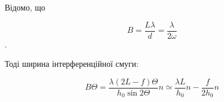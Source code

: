 Відомо, що 

$$ B = \frac{L \lambda}{d} = \frac{\lambda}{2\omega} $$.

Тоді ширина інтерференційної смуги:

\begin{equation} \label{eq:2}
    B\Theta = \frac{\lambda(2L - f)\Theta}{h_0 \sin{2\Theta}}n \simeq 
    \frac{\lambda L}{h_0} n - \frac{f}{2 h_0}n 
\end{equation}


